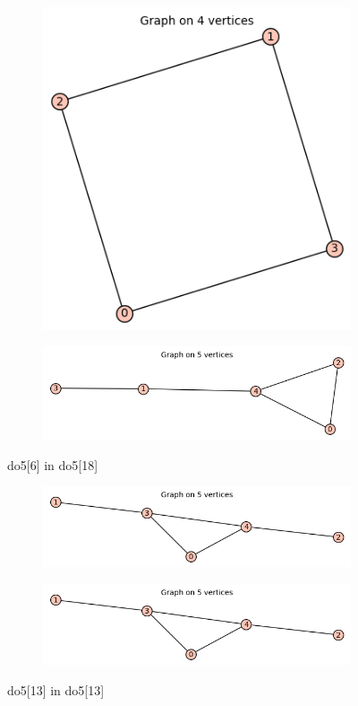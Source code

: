 \documentclass[12pt, a4paper]{article}
\begin{document}
\begin{center}
\begin{figure}[!htb]
\centering
\begin{subfigure}{0.5\textwidth}
  \centering
  \includegraphics[width=0.55\linewidth]{do5[6]}
\end{subfigure}%
\begin{subfigure}{0.5\textwidth}
  \centering
  \includegraphics[width=0.9\linewidth]{do5[18]}
\end{subfigure}
\caption{do5[6] in do5[18]}
\label{fig:test}
\end{figure}

\begin{figure}[!htb]
\centering
\begin{subfigure}{0.5\textwidth}
  \centering
  \includegraphics[width=0.8\linewidth]{do5[13]}
\end{subfigure}%
\begin{subfigure}{0.5\textwidth}
  \centering
  \includegraphics[width=0.8\linewidth]{do5[13]}
\end{subfigure}
\caption{do5[13] in do5[13]}
\label{fig:test}
\end{figure}


\end{center}
\end{document}
